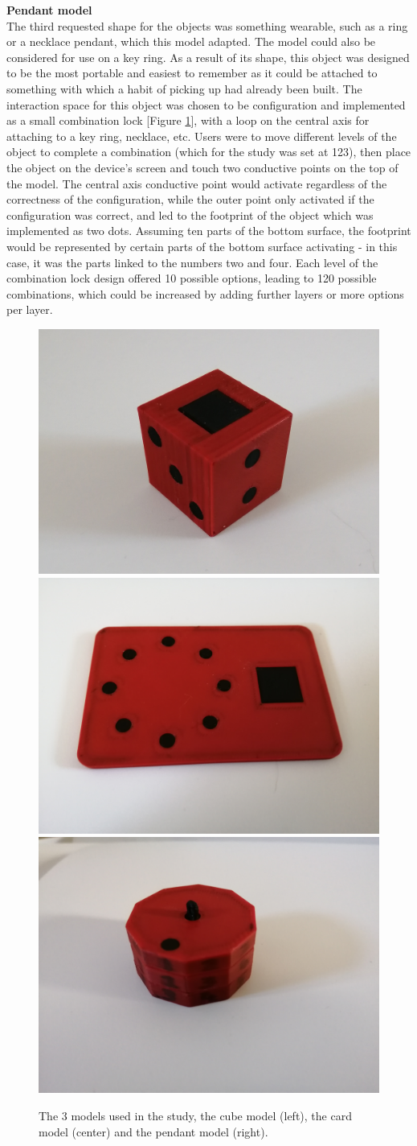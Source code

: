 \documentclass{l4proj}
\begin{document}
\textbf{Pendant model}\\
The third requested shape for the objects was something wearable, such as a ring or a necklace pendant, which this model adapted. The model could also be considered for use on a key ring. As a result of its shape, this object was designed to be the most portable and easiest to remember as it could be attached to something with which a habit of picking up had already been built. The interaction space for this object was chosen to be configuration and implemented as a small combination lock [Figure \ref{fig:models}], with a loop on the central axis for attaching to a key ring, necklace, etc. Users were to move different levels of the object to complete a combination (which for the study was set at 123), then place the object on the device's screen and touch two conductive points on the top of the model. The central axis conductive point would activate regardless of the correctness of the configuration, while the outer point only activated if the configuration was correct, and led to the footprint of the object which was implemented as two dots. Assuming ten parts of the bottom surface, the footprint would be represented by certain parts of the bottom surface activating - in this case, it was the parts linked to the numbers two and four. Each level of the combination lock design offered 10 possible options, leading to 120 possible combinations, which could be increased by adding further layers or more options per layer.

\begin{figure}
    \includegraphics[width=.33\linewidth]{images/die_pic_general.jpg}
    \includegraphics[width=.33\linewidth]{images/ccard_pic_general.jpg}
    \includegraphics[width=.33\linewidth]{images/pendant_pic_1.jpg}
    \caption{The 3 models used in the study, the cube model (left), the card model (center) and the pendant model (right).}
    \label{fig:models}
\end{figure}
\end{document}
